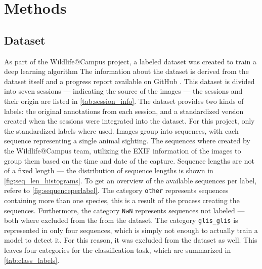 

\section{Methods}
\label{methods}

    \subsection{Dataset}
    As part of the Wildlife@Campus project, a labeled dataset was created to train a deep learning algorithm
    The information about the dataset is derived from the dataset itself and a progress report available on GitHub \autocite{ratnaweeraWildlifeCampusProgressReports2021}.
    This dataset is divided into seven sessions --- indicating the source of the images --- the sessions and their origin are listed in \autoref{tab:session_info}.
    The dataset provides two kinds of labels: the original annotations from each session, and a standardized version created when the sessions were integrated into the dataset.
    For this project, only the standardized labels where used.
    Images group into sequences, with each sequence representing a single animal sighting.
    The sequences where created by the Wildlife@Campus team, utilizing the \ac{EXIF} information of the images to group them based on the time and date of the capture.
    Sequence lengths are not of a fixed length --- the distribution of sequence lengths is shown in \autoref{fig:seq_len_histograms}.
    To get an overview of the available sequences per label, refere to \autoref{fig:sequenceperlabel}.
    The category \texttt{other} represents sequences containing more than one species, this is a result of the process creating the sequences.
    Furthermore, the category \texttt{NaN} represents sequences not labeled --- both where excluded from the from the dataset.
    The category \texttt{glis\_glis} is represented in only four sequences, which is simply not enough to actually train a model to detect it.
    For this reason, it was excluded from the dataset as well.
    This leaves four categories for the classification task, which are summarized in \autoref{tab:class_labels}.

